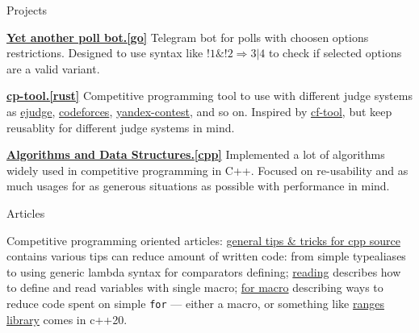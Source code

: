\documentclass{resume} %
\begin{document}
\begin{rSection}{Projects}
  \vspace{-1.25em}
  \item \href{https://github.com/dendi239/yet-another-poll-bot}{\textbf{Yet another poll bot.[go]}} {
  Telegram bot for polls with choosen options restrictions.
  Designed to use syntax like $!1 \& !2 \Rightarrow 3 | 4$ to check if selected options are a valid variant.
  }
  \item \href{https://github.com/dendi239/cp-tool}{\textbf{cp-tool.[rust]}} {
  Competitive programming tool to use with different judge systems as \href{https://ejudge.ru}{ejudge}, \href{https://codeforces.com}{codeforces}, \href{https://contest.yandex.ru}{yandex-contest}, and so on.
  Inspired by \href{https://github.com/xalanq/cf-tool}{cf-tool}, but keep reusablity for different judge systems in mind.
  }
  \item \href{https://github.com/dendi239/algorithms-data-structures}{\textbf{Algorithms and Data Structures.[cpp]}} {
  Implemented a lot of algorithms widely used in competitive programming in C++. Focused on re-usability and as much usages for as generous situations as possible with performance in mind.
  }
\end{rSection}


\begin{rSection}{Articles}

  Competitive programming oriented articles:
  \href{https://codeforces.com/blog/entry/79446}{general tips \& tricks for cpp source} contains various tips can reduce amount of written code: from simple typealiases to using generic lambda syntax for comparators defining;
  \href{https://codeforces.com/blog/entry/79066}{reading} describes how to define and read variables with single macro;
  \href{https://codeforces.com/blog/entry/79100}{for macro} describing ways to reduce code spent on simple \texttt{for} --- either a macro, or something like \href{https://en.cppreference.com/w/cpp/ranges}{ranges library} comes in c++20.

\end{rSection}

\end{document}
